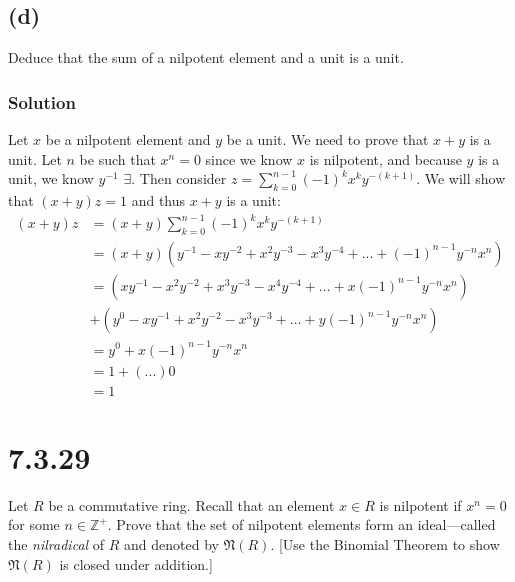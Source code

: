 \documentclass[fleqn]{article}
\begin{document}
        \subsection{(d)}
        Deduce that the sum of a nilpotent element and a unit is a unit.
        
            \subsubsection{Solution}
            Let $x$ be a nilpotent element and $y$ be a unit.  We need to prove that $x + y$ is a unit.  Let $n$ be such that $x^n = 0$ since we know $x$ is nilpotent, and because $y$ is a unit, we know $y^{-1}$ $\exists$.  Then consider $z = \sum\limits_{k = 0}^{n - 1} (-1)^k x^k y^{-(k + 1)}$.  We will show that $(x + y)z = 1$ and thus $x + y$ is a unit:
            \begin{align}
                (x + y)z &= (x + y) \sum\limits_{k = 0}^{n - 1} (-1)^k x^k y^{-(k + 1)} \\
                    &= (x + y)(y^{-1} - x y^{-2} + x^2 y^{-3} - x^3 y^{-4} + ... + (-1)^{n - 1} y^{-n} x^n) \\
                    &= (x y^{-1} - x^2 y^{-2} + x^3 y^{-3} - x^4 y^{-4} + ... + x (-1)^{n - 1} y^{-n} x^n) \\
                    &+ (y^0 - x y^{-1} + x^2 y^{-2} - x^3 y^{-3} + ... + y (-1)^{n - 1} y^{-n} x^n) \\
                    &= y^0 + x (-1)^{n - 1} y^{-n} x^n \\
                    &= 1 + (...) 0 \\
                    &= 1
            \end{align}
    
    \section{7.3.29}
    Let $R$ be a commutative ring.  Recall that an element $x \in R$ is nilpotent if $x^n = 0$ for some $n \in \mathbb{Z}^+$.  Prove that the set of nilpotent elements form an ideal---called the \textit{nilradical} of $R$ and denoted by $\mathfrak{N}(R)$.  [Use the Binomial Theorem to show $\mathfrak{N}(R)$ is closed under addition.]
        
\end{document}
